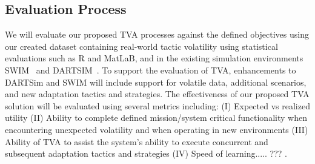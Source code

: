 












\subsection{Evaluation Process}


We will evaluate our proposed TVA processes against the defined objectives using our created dataset containing real-world tactic volatility using statistical evaluations such as R and MatLaB, and in the existing simulation environments SWIM~\cite{moreno2018swim} and DARTSIM~\cite{MorenoDART2019}. %
To support the evaluation of TVA, enhancements to DARTSim and SWIM will include support for volatile data, additional scenarios, and new adaptation tactics and strategies. The effectiveness of our proposed TVA solution will be evaluated using several metrics including: (I) Expected vs realized utility (II) Ability to complete defined mission/system critical functionality when encountering unexpected volatility and when operating in new environments (III) Ability of TVA to assist the system's ability to execute concurrent and subsequent adaptation tactics and strategies (IV) Speed of learning..... ???   .

